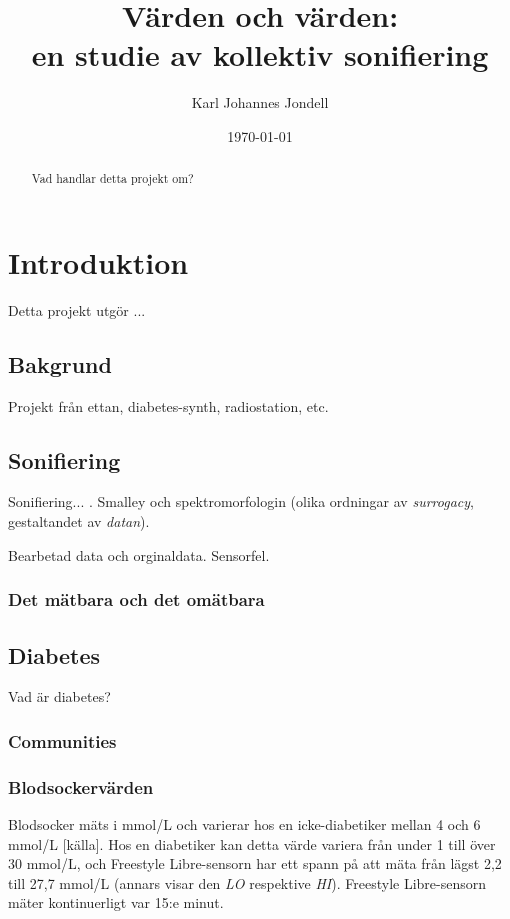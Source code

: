 \documentclass[11pt, twoside, a4paper]{article}
\title{Värden och värden:\\
	\large en studie av kollektiv sonifiering
}
\author{Karl Johannes Jondell}
\date{\today}
\begin{document}
\maketitle

\begin{abstract}
Vad handlar detta projekt om?
\end{abstract}


\tableofcontents

\section{Introduktion}
Detta projekt utgör ...

\subsection{Bakgrund}
Projekt från ettan, diabetes-synth, radiostation, etc.

\subsection{Sonifiering}
Sonifiering... \cite{bijsterveld_sonic_2019}. 
Smalley och spektromorfologin (olika ordningar av \emph{surrogacy},  gestaltandet av \emph{datan}).

Bearbetad data och orginaldata. Sensorfel.
\subsubsection{Det mätbara och det omätbara}
\cite{bornemark_det_2018}

\subsection{Diabetes}
Vad är diabetes? 

\subsubsection{Communities}

\subsubsection{Blodsockervärden}
Blodsocker mäts i mmol/L och varierar hos en icke-diabetiker mellan 4 och 6 mmol/L [källa]. Hos en diabetiker kan detta värde variera från under 1 till över 30 mmol/L, och Freestyle Libre-sensorn har ett spann på att mäta från lägst 2,2 till 27,7 mmol/L (annars visar den \emph{LO} respektive \emph{HI}). Freestyle Libre-sensorn mäter kontinuerligt var 15:e minut.
\end{document}
